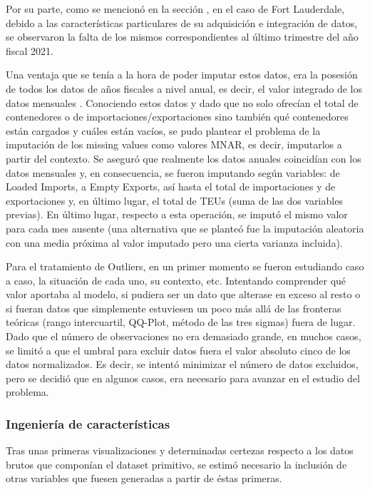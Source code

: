 \documentclass{article}
\begin{document}
		Por su parte, como se mencionó en la sección \cite[Origen de los datos]{}, en el caso de Fort Lauderdale, debido a las características particulares de su adquisición e integración de datos, se observaron la falta de los mismos correspondientes al último trimestre del año fiscal 2021.\
		
		Una ventaja que se tenía a la hora de poder imputar estos datos, era la posesión de todos los datos de años fiscales a nivel anual, es decir, el valor integrado de los datos mensuales \cite[]{Preliminary_Waterborne_Commerce_Chart_2024}. Conociendo estos datos y dado que no solo ofrecían el total de contenedores o de importaciones/exportaciones sino también qué contenedores están cargados y cuáles están vacíos, se pudo plantear el problema de la imputación de los missing values como valores MNAR, es decir, imputarlos a partir del contexto. Se aseguró que realmente los datos anuales coincidían con los datos mensuales y, en consecuencia, se fueron imputando según variables: de Loaded Imports, a Empty Exports, así hasta el total de importaciones y de exportaciones y, en último lugar, el total de TEUs (suma de las dos variables previas). En último lugar, respecto a esta operación, se imputó el mismo valor para cada mes ausente (una alternativa que se planteó fue la imputación aleatoria con una media próxima al valor imputado pero una cierta varianza incluida).\
		
		Para el tratamiento de Outliers, en un primer momento se fueron estudiando caso a caso, la situación de cada uno, su contexto, etc. Intentando comprender qué valor aportaba al modelo, si pudiera ser un dato que alterase en exceso al resto o si fueran datos que simplemente estuviesen un poco más allá de las fronteras teóricas (rango intercuartil, QQ-Plot, método de las tres sigmas) fuera de lugar. Dado que el número de observaciones no era demasiado grande, en muchos casos, se limitó a que el umbral para excluir datos fuera el valor absoluto cinco de los datos normalizados. Es decir, se intentó minimizar el número de datos excluidos, pero se decidió que en algunos casos, era necesario para avanzar en el estudio del problema.
		
		
		
	
		\subsubsection{Ingeniería de características}
		Tras unas primeras visualizaciones y determinadas certezas respecto a los datos brutos que componían el dataset primitivo, se estimó necesario la inclusión de otras variables que fuesen generadas a partir de éstas primeras.\
		
\end{document}
